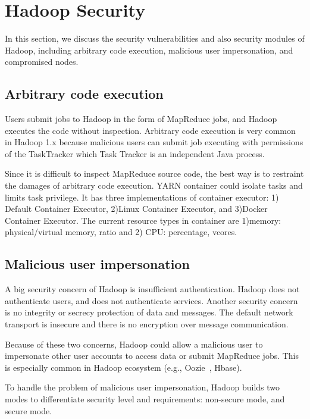 \section{Hadoop Security}
\label{security}

In this section, we discuss the security vulnerabilities and also security modules of Hadoop, including arbitrary code execution, malicious user impersonation, and compromised nodes.

\subsection{Arbitrary code execution}

Users submit jobs to Hadoop in the form of MapReduce jobs, and Hadoop executes the code without inspection. Arbitrary code execution is very common in Hadoop 1.x because malicious users can submit job executing with permissions of the TaskTracker which Task Tracker is an independent Java process.

Since it is difficult to inspect MapReduce source code, the best way is to restraint the damages of arbitrary code execution. YARN container could isolate tasks and limits task privilege. It has three implementations of container executor: 1) Default Container Executor, 2)Linux Container Executor, and 3)Docker Container Executor. The current resource types in container are 1)memory: physical/virtual memory, ratio and 2) CPU: percentage, vcores.

\subsection{Malicious user impersonation}

A big security concern of Hadoop is insufficient authentication. Hadoop does not authenticate users, and does not authenticate services. Another security concern is no integrity or secrecy protection of data and messages. The default network transport is insecure and there is no encryption over message communication.

Because of these two concerns, Hadoop could allow a malicious user to impersonate other user accounts to access data or submit MapReduce jobs. This is especially common in Hadoop ecosystem (e.g., Oozie~\cite{oozie}, Hbase).

To handle the problem of malicious user impersonation, Hadoop builds two modes to differentiate security level and requirements: non-secure mode, and secure mode.

